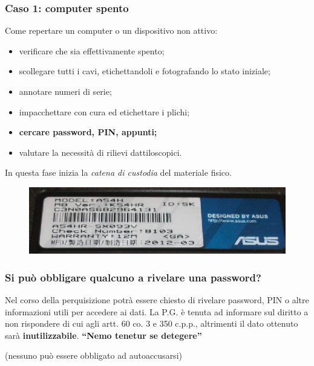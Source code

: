 \documentclass[11pt]{beamer}
\begin{document}
	\begin{frame}
		\frametitle{Caso 1: computer spento}
		Come repertare un computer o un dispositivo non attivo:
		
			\begin{itemize}
				\item verificare che sia effettivamente spento;
				\item scollegare tutti i cavi, etichettandoli e fotografando lo stato iniziale;		
				\item annotare numeri di serie;
				\item impacchettare con cura ed etichettare i plichi;
				\item \textbf{cercare password, PIN, appunti;}
				\item valutare la necessità di rilievi dattiloscopici.
			\end{itemize}		
		In questa fase inizia la \textit{catena di custodia} del materiale fisico.
		\begin{figure}
			\centering
			\includegraphics[width=0.6\linewidth]{pics/label1}
			
			\label{fig:label1}
		\end{figure}

			
	\end{frame}
	
	\begin{frame}
		\frametitle{Si può obbligare qualcuno a rivelare una password?}
		
		Nel corso della perquisizione potrà essere chiesto di rivelare password, PIN o altre informazioni utili per accedere ai dati.
		\vfill
		La P.G. è tenuta ad informare sul diritto a non rispondere di cui agli artt. 60 co. 3 e 350 c.p.p., altrimenti il dato ottenuto sarà \textbf{inutilizzabile}.
		\vfill
		\centering
		\Large\textbf{``Nemo tenetur se detegere''}
		
		\scriptsize(nessuno può essere obbligato ad autoaccusarsi)
		
	\end{frame}
	
\end{document}
